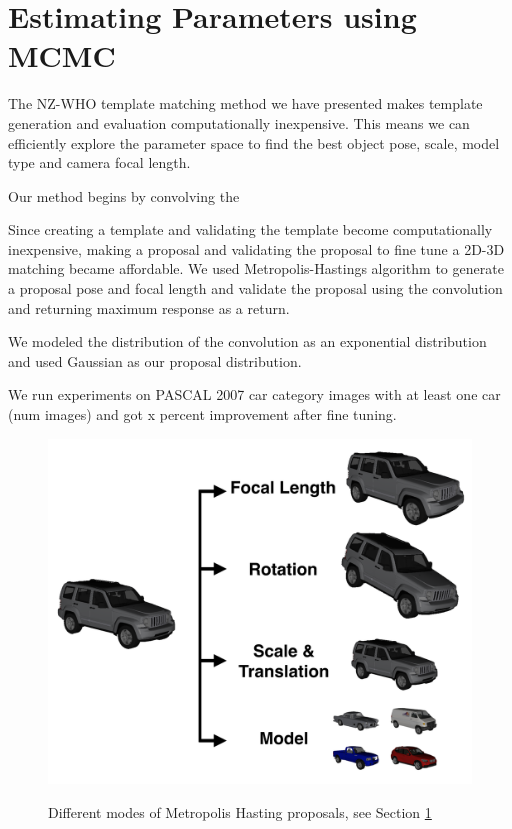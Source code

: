 \documentclass[10pt,twocolumn,letterpaper]{article}
\begin{document}
\section{Estimating Parameters using MCMC}
\label{sec:fine}
The NZ-WHO template matching method we have presented makes template generation and evaluation computationally inexpensive. This means we can efficiently explore the parameter space to find the best object pose, scale, model type and camera focal length.

Our method begins by convolving the 

Since creating a template and validating the template become computationally inexpensive, making a proposal and validating the proposal to fine tune a 2D-3D matching became affordable. We used Metropolis-Hastings algorithm to generate a proposal pose and focal length and validate the proposal using the convolution and returning maximum response as a return.

We modeled the distribution of the convolution as an exponential distribution and used Gaussian as our proposal distribution.  

We run experiments on PASCAL 2007 car category images with at least one car (num images) and got x percent improvement after fine tuning.

\begin{figure}[t]
\centering
    \includegraphics[width=0.7\linewidth]{tuning2} \\ [-5pt]
    \caption{Different modes of Metropolis Hasting proposals, see Section \ref{sec:fine}}
 \label{fig:tuningmode}
\end{figure}
    
\end{document}
